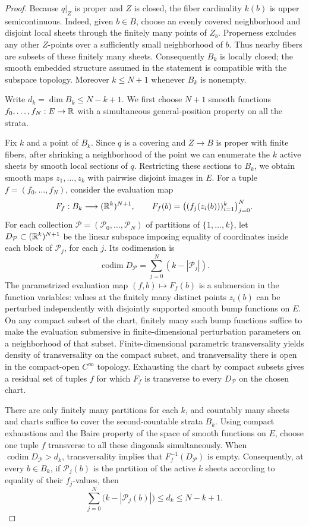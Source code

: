 \begin{proof}
Because $q|_Z$ is proper and $Z$ is closed,
the fiber cardinality $k(b)$ is upper
semicontinuous. Indeed, given $b\in B$, choose
an evenly covered neighborhood and disjoint
local sheets through the finitely many points
of $Z_b$. Properness excludes any other
$Z$-points over a sufficiently small
neighborhood of $b$. Thus nearby fibers
are subsets of these finitely many sheets.
Consequently $B_k$ is locally closed;
the smooth embedded structure assumed in
the statement is compatible with the
subspace topology. Moreover $k\leq N+1$
whenever $B_k$ is nonempty.

Write $d_k=\dim B_k\leq N-k+1$. We first
choose $N+1$ smooth functions
$f_0,\ldots,f_N:E\to\mathbb{R}$ with a simultaneous
general-position property on all the strata.

Fix $k$ and a point of $B_k$. Since $q$ is a
covering and $Z\to B$ is proper with finite
fibers, after shrinking a neighborhood of the
point we can enumerate the $k$ active sheets
by smooth local sections of $q$. Restricting
these sections to $B_k$, we obtain smooth
maps $z_1,\ldots,z_k$ with pairwise disjoint
images in $E$. For a tuple
$f=(f_0,\ldots,f_N)$, consider the evaluation
map
\[
 F_f:B_k\longrightarrow (\mathbb{R}^k)^{N+1},
 \qquad
 F_f(b)=\bigl((f_j(z_i(b)))_{i=1}^{k}
                  \bigr)_{j=0}^{N}.
\]
For each collection
$\mathcal P=(\mathcal P_0,\ldots,\mathcal P_N)$
of partitions of $\{1,\ldots,k\}$, let
$D_{\mathcal P}\subset(\mathbb{R}^k)^{N+1}$ be
the linear subspace imposing equality of
coordinates inside each block of
$\mathcal P_j$, for each $j$. Its codimension
is
\[
 \operatorname{codim}D_{\mathcal P}
 =\sum_{j=0}^N(k-|\mathcal P_j|).
\]
The parametrized evaluation map
$(f,b)\mapsto F_f(b)$ is a submersion in the
function variables: values at the finitely
many distinct points $z_i(b)$ can be
perturbed independently with disjointly
supported smooth bump functions on $E$.
On any compact subset of the chart, finitely many
such bump functions suffice to make the evaluation
submersive in finite-dimensional perturbation parameters
on a neighborhood of that subset. Finite-dimensional
parametric transversality yields density of transversality
on the compact subset, and transversality there is open
in the compact-open $C^\infty$ topology. Exhausting the
chart by compact subsets gives a residual set of tuples
$f$ for which $F_f$ is transverse to every
$D_{\mathcal P}$ on the chosen chart.

There are only finitely many partitions for
each $k$, and countably many sheets and
charts suffice to cover the second-countable
strata $B_k$. Using compact exhaustions
and the Baire property of the space of
smooth functions on $E$, choose one tuple
$f$ transverse to all these diagonals
simultaneously. When
$\operatorname{codim}D_{\mathcal P}>d_k$,
transversality implies that
$F_f^{-1}(D_{\mathcal P})$ is empty.
Consequently, at every $b\in B_k$, if
$\mathcal P_j(b)$ is the partition of the
active $k$ sheets according to equality of
their $f_j$-values, then
\begin{equation}\label{eq:selection-inequality}
 \sum_{j=0}^N
 \bigl(k-|\mathcal P_j(b)|\bigr)
 \leq d_k\leq N-k+1.
\end{equation}


\end{proof}
